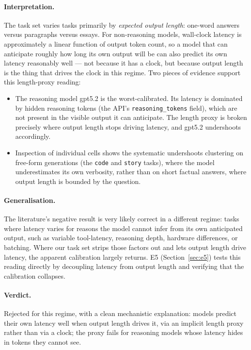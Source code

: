 \documentclass[11pt]{article}
\newcommand{\code}[1]{\texttt{\small #1}}
\begin{document}
\paragraph{Interpretation.} The task set varies tasks primarily by \emph{expected output
length}: one-word answers versus paragraphs versus essays. For non-reasoning models, wall-clock
latency is approximately a linear function of output token count, so a model that can
anticipate roughly how long its own output will be can also predict its own latency reasonably
well --- not because it has a clock, but because output length is the thing that drives the
clock in this regime. Two pieces of evidence support this length-proxy reading:

\begin{itemize}
\item The reasoning model gpt5.2 is the worst-calibrated. Its latency is dominated by hidden
reasoning tokens (the API's \code{reasoning\_tokens} field), which are not present in the
visible output it can anticipate. The length proxy is broken precisely where output length
stops driving latency, and gpt5.2 undershoots accordingly.

\item Inspection of individual cells shows the systematic undershoots clustering on free-form
generations (the \code{code} and \code{story} tasks), where the model underestimates its own
verbosity, rather than on short factual answers, where output length is bounded by the
question.
\end{itemize}

\paragraph{Generalisation.} The literature's negative result \citep{garikaparthi2026time} is
very likely correct in a different regime: tasks where latency varies for reasons the model
cannot infer from its own anticipated output, such as variable tool-latency, reasoning depth,
hardware differences, or batching. Where our task set strips those factors out and lets output
length drive latency, the apparent calibration largely returns. E5 (Section~\ref{sec:e5}) tests
this reading directly by decoupling latency from output length and verifying that the
calibration collapses.

\paragraph{Verdict.} Rejected for this regime, with a clean mechanistic explanation: models
predict their own latency well when output length drives it, via an implicit length proxy
rather than via a clock; the proxy fails for reasoning models whose latency hides in tokens
they cannot see.
\end{document}

